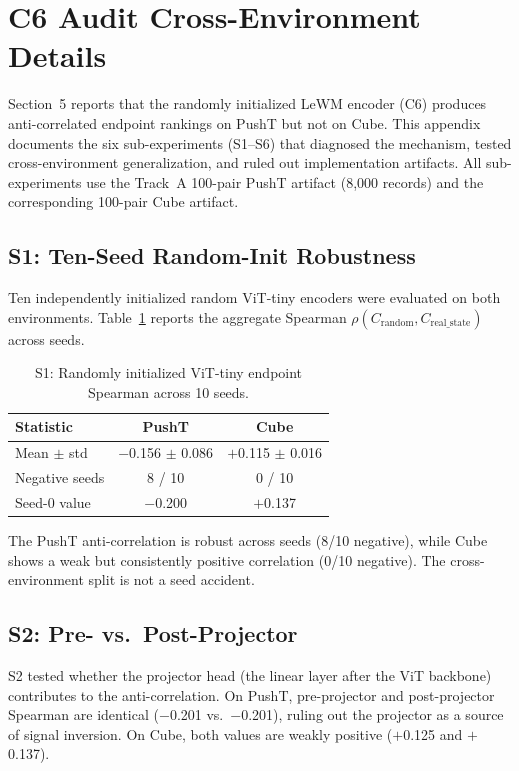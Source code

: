 \section{C6 Audit Cross-Environment Details}
\label{app:c6_audit}

Section~5 reports that the randomly initialized LeWM encoder (C6) produces
anti-correlated endpoint rankings on PushT but not on Cube.  This appendix
documents the six sub-experiments (S1--S6) that diagnosed the mechanism,
tested cross-environment generalization, and ruled out implementation
artifacts.  All sub-experiments use the Track~A 100-pair PushT artifact
(8{,}000 records) and the corresponding 100-pair Cube artifact.

\subsection{S1: Ten-Seed Random-Init Robustness}
\label{app:s1}

Ten independently initialized random ViT-tiny encoders were evaluated on
both environments.  Table~\ref{tab:s1} reports the aggregate Spearman
$\rho(C_\text{random}, C_\text{real\_state})$ across seeds.

\begin{table}[h]
\centering
\caption{S1: Randomly initialized ViT-tiny endpoint Spearman across 10 seeds.}
\label{tab:s1}
\begin{tabular}{lcc}
\toprule
Statistic & PushT & Cube \\
\midrule
Mean $\pm$ std & $-$0.156 $\pm$ 0.086 & $+$0.115 $\pm$ 0.016 \\
Negative seeds & 8 / 10 & 0 / 10 \\
Seed-0 value & $-$0.200 & $+$0.137 \\
\bottomrule
\end{tabular}
\end{table}

The PushT anti-correlation is robust across seeds (8/10 negative), while
Cube shows a weak but consistently positive correlation (0/10 negative).
The cross-environment split is not a seed accident.

\subsection{S2: Pre- vs.\ Post-Projector}
\label{app:s2}

S2 tested whether the projector head (the linear layer after the ViT
backbone) contributes to the anti-correlation.  On PushT, pre-projector and
post-projector Spearman are identical ($-$0.201 vs.\ $-$0.201), ruling out
the projector as a source of signal inversion.  On Cube, both values are
weakly positive ($+$0.125 and $+$0.137).


